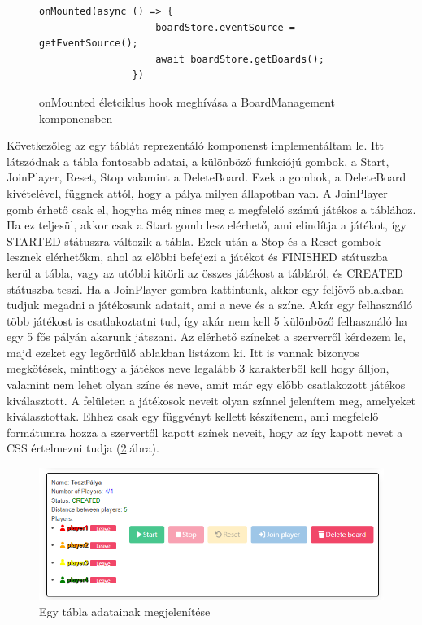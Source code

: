\documentclass[a4paper,twoside]{article}
\begin{document}
\begin{figure}
	\caption{onMounted életciklus hook meghívása a BoardManagement komponensben}
	
		\begin{minipage}{\textwidth}
			\begin{lstlisting}[style=javascriptStyle]
				onMounted(async () => {
					boardStore.eventSource = getEventSource();
					await boardStore.getBoards();
				})
			\end{lstlisting}
		\end{minipage}
	
	\label{onMounted}
\end{figure}
\FloatBarrier

Következőleg az egy táblát reprezentáló komponenst implementáltam le. Itt látszódnak a tábla
fontosabb adatai, a különböző funkciójú gombok, a Start, JoinPlayer, Reset, Stop valamint a DeleteBoard. Ezek a gombok, a DeleteBoard kivételével, függnek attól, hogy a pálya milyen állapotban van. A JoinPlayer gomb érhető csak el, hogyha még nincs meg a megfelelő számú játékos a táblához. Ha ez teljesül, akkor csak a Start gomb lesz elérhető, ami elindítja a játékot, így STARTED státuszra változik a tábla. Ezek után a Stop és a Reset gombok lesznek elérhetőkm, ahol az előbbi befejezi a játékot és FINISHED státuszba kerül a tábla, vagy az utóbbi kitörli az összes játékost a tábláról, és CREATED státuszba teszi. Ha a JoinPlayer gombra kattintunk, akkor egy feljövő ablakban tudjuk megadni a játékosunk adatait, ami a neve és a színe. Akár egy felhasználó több játékost is csatlakoztatni tud, így akár nem kell 5 különböző felhasználó ha egy 5 fős pályán akarunk játszani. Az elérhető színeket a szerverről kérdezem le, majd ezeket egy legördülő ablakban listázom ki. Itt is vannak bizonyos megkötések, minthogy a játékos neve legalább 3 karakterből kell hogy álljon, valamint nem lehet olyan színe és neve, amit már egy előbb csatlakozott játékos kiválasztott. A felületen a játékosok neveit olyan színnel jelenítem meg, amelyeket kiválasztottak. Ehhez csak egy függvényt kellett készítenem, ami megfelelő formátumra hozza a szervertől kapott színek neveit, hogy az így kapott nevet a CSS értelmezni tudja (\ref{board}.ábra). 

\begin{figure}
	\caption{Egy tábla adatainak megjelenítése}
	\label{board}
	\centering
	\includegraphics[scale=0.63]{board}
\end{figure}
\end{document}

